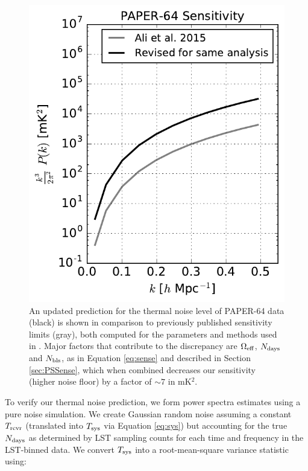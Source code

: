 \documentclass[preprint2,numberedappendix,tighten]{aastex6}  %
\begin{document}
\begin{figure}
	\centering
	\includegraphics[width=\columnwidth]{plots/sense_check.pdf}
	\caption{An updated prediction for the thermal noise level of PAPER-64 data (black) is shown in comparison to previously 
published sensitivity limits (gray), both computed for the parameters and methods used in . Major factors that contribute to the discrepancy are $
\Omega_{\rm eff}$, $N_{\rm days}$ and $N_{\rm bls}$, as in Equation \eqref{eq:sense} and described in Section \ref{sec:PSSense}, which when combined decreases our 
sensitivity (higher noise floor) by a factor of $\sim7$ in mK$^{2}$.}
	\label{fig:sense_check}
\end{figure}

To verify our thermal noise prediction, we form power spectra estimates using a pure noise simulation. We create Gaussian 
random noise assuming a constant $T_{\rm rcvr}$ (translated into $T_{\rm sys}$ via Equation \eqref{eq:sys}) but accounting for the true $N_{\rm days}$ as determined 
by LST sampling counts for each time and frequency in the LST-binned data. We convert $T_{\rm sys}$ into a root-mean-square variance statistic 
using:
\end{document}
